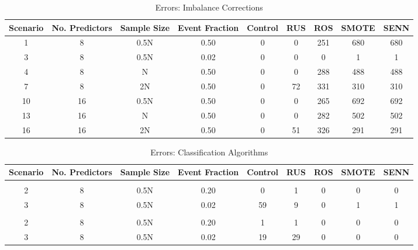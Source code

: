 \documentclass[
]{article}
\begin{document}
\begin{table}[!h]

\caption{\label{tab:tab:table}Errors: Imbalance Corrections}
\centering
\begin{tabular}[t]{ccccccccc}
\toprule
Scenario & No. Predictors & Sample Size & Event Fraction & Control & RUS & ROS & SMOTE & SENN\\
\midrule
1 & 8 & 0.5N & 0.50 & 0 & 0 & 251 & 680 & 680\\
 
3 & 8 & 0.5N & 0.02 & 0 & 0 & 0 & 1 & 1\\
 
4 & 8 & N & 0.50 & 0 & 0 & 288 & 488 & 488\\
 
7 & 8 & 2N & 0.50 & 0 & 72 & 331 & 310 & 310\\
 
10 & 16 & 0.5N & 0.50 & 0 & 0 & 265 & 692 & 692\\
 
13 & 16 & N & 0.50 & 0 & 0 & 282 & 502 & 502\\
 
16 & 16 & 2N & 0.50 & 0 & 51 & 326 & 291 & 291\\
\bottomrule
\end{tabular}
\end{table}

\begin{table}[!h]

\caption{\label{tab:tab:table}Errors: Classification Algorithms}
\centering
\begin{tabular}[t]{ccccccccc}
\toprule
Scenario & No. Predictors & Sample Size & Event Fraction & Control & RUS & ROS & SMOTE & SENN\\
\midrule
\addlinespace[0.3em]
\multicolumn{9}{l}{\textbf{RUSBoost:}}\\
\hspace{2em}\hspace{1em}2 & 8 & 0.5N & 0.20 & 0 & 1 & 0 & 0 & 0\\
 
\hspace{2em}\hspace{1em}3 & 8 & 0.5N & 0.02 & 59 & 9 & 0 & 1 & 1\\
 
\addlinespace[0.3em]
\multicolumn{9}{l}{\textbf{EasyEnsemble:}}\\
\hspace{2em}\hspace{1em}2 & 8 & 0.5N & 0.20 & 1 & 1 & 0 & 0 & 0\\
 
\hspace{2em}\hspace{1em}3 & 8 & 0.5N & 0.02 & 19 & 29 & 0 & 0 & 0\\
\bottomrule
\end{tabular}
\end{table}
\end{document}
